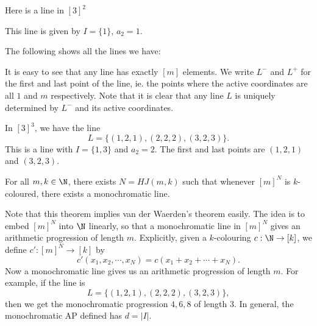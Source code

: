 \documentclass[a4paper]{article}
\begin{document}
\begin{eg}
  Here is a line in $[3]^2$
  \begin{center}
  \end{center}
  This line is given by $I = \{1\}$, $a_2 = 1$.

  The following shows all the lines we have:
  \begin{center}
  \end{center}
\end{eg}
It is easy to see that any line has exactly $[m]$ elements. We write $L^-$ and $L^+$ for the first and last point of the line, ie. the points where the active coordinates are all $1$ and $m$ respectively. Note that it is clear that any line $L$ is uniquely determined by $L^-$ and its active coordinates.

\begin{eg}
  In $[3]^3$, we have the line
  \[
    L = \{(1, 2, 1), (2, 2, 2), (3, 2, 3)\}.
  \]
  This is a line with $I = \{1, 3\}$ and $a_2 = 2$. The first and last points are $(1, 2, 1)$ and $(3, 2, 3)$.
\end{eg}

\begin{thm}
  For all $m, k \in \N$, there exists $N = HJ(m, k)$ such that whenever $[m]^N$ is $k$-coloured, there exists a monochromatic line.
\end{thm}
Note that this theorem implies van der Waerden's theorem easily. The idea is to embed $[m]^N$ into $\N$ linearly, so that a monochromatic line in $[m]^N$ gives an arithmetic progression of length $m$. Explicitly, given a $k$-colouring $c: \N \to [k]$, we define $c': [m]^N \to [k]$ by
\[
  c'(x_1, x_2, \cdots, x_N) = c(x_1 + x_2 + \cdots + x_N).
\]
Now a monochromatic line gives us an arithmetic progression of length $m$. For example, if the line is
\[
  L = \{(1, 2, 1), (2, 2, 2), (3, 2, 3)\},
\]
then we get the monochromatic progression $4, 6, 8$ of length $3$. In general, the monochromatic AP defined has $d = |I|$.
\end{document}
